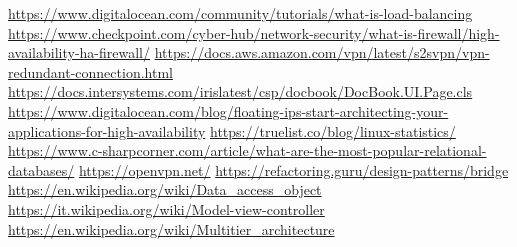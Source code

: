 \begin{thebibliography}{9}
     \url{https://www.digitalocean.com/community/tutorials/what-is-load-balancing}
     \url{https://www.checkpoint.com/cyber-hub/network-security/what-is-firewall/high-availability-ha-firewall/}
     \url{https://docs.aws.amazon.com/vpn/latest/s2svpn/vpn-redundant-connection.html}
     \url{https://docs.intersystems.com/irislatest/csp/docbook/DocBook.UI.Page.cls}
     \url{https://www.digitalocean.com/blog/floating-ips-start-architecting-your-applications-for-high-availability}
     \url{https://truelist.co/blog/linux-statistics/}
     \url{https://www.c-sharpcorner.com/article/what-are-the-most-popular-relational-databases/}
     \url{https://openvpn.net/}
     \url{https://refactoring.guru/design-patterns/bridge}
     \url{https://en.wikipedia.org/wiki/Data_access_object}
     \url{https://it.wikipedia.org/wiki/Model-view-controller}
     \url{https://en.wikipedia.org/wiki/Multitier_architecture}
\end{thebibliography}